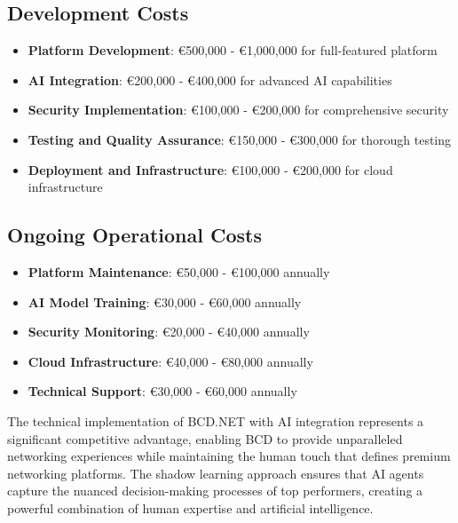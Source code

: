 \subsection{Development Costs}
\begin{itemize}
    \item \textbf{Platform Development}: €500,000 - €1,000,000 for full-featured platform
    \item \textbf{AI Integration}: €200,000 - €400,000 for advanced AI capabilities
    \item \textbf{Security Implementation}: €100,000 - €200,000 for comprehensive security
    \item \textbf{Testing and Quality Assurance}: €150,000 - €300,000 for thorough testing
    \item \textbf{Deployment and Infrastructure}: €100,000 - €200,000 for cloud infrastructure
\end{itemize}

\subsection{Ongoing Operational Costs}
\begin{itemize}
    \item \textbf{Platform Maintenance}: €50,000 - €100,000 annually
    \item \textbf{AI Model Training}: €30,000 - €60,000 annually
    \item \textbf{Security Monitoring}: €20,000 - €40,000 annually
    \item \textbf{Cloud Infrastructure}: €40,000 - €80,000 annually
    \item \textbf{Technical Support}: €30,000 - €60,000 annually
\end{itemize}

The technical implementation of BCD.NET with AI integration represents a significant competitive advantage, enabling BCD to provide unparalleled networking experiences while maintaining the human touch that defines premium networking platforms. The shadow learning approach ensures that AI agents capture the nuanced decision-making processes of top performers, creating a powerful combination of human expertise and artificial intelligence. 